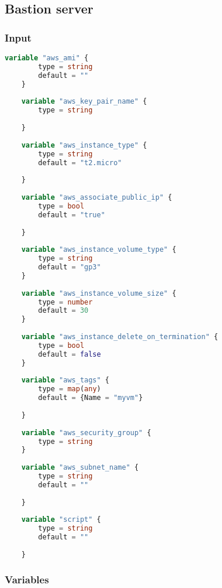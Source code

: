 \subsection{
{Bastion server}}
\label{sec:Bastion server}

\subsubsection{
{Input}}

\begin{lstlisting}[language=terraform]
    variable "aws_ami" {
        type = string
        default = ""
    }
    
    variable "aws_key_pair_name" {
        type = string
      
    }
    
    variable "aws_instance_type" {
        type = string
        default = "t2.micro"
      
    }
    
    variable "aws_associate_public_ip" {
        type = bool
        default = "true"
      
    }
    
    variable "aws_instance_volume_type" {
        type = string
        default = "gp3"
    }
    
    variable "aws_instance_volume_size" {
        type = number
        default = 30
    }
    
    variable "aws_instance_delete_on_termination" {
        type = bool
        default = false
    }
    
    variable "aws_tags" {
        type = map(any)
        default = {Name = "myvm"}
      
    }
    
    variable "aws_security_group" {
        type = string
    }
    
    variable "aws_subnet_name" {
        type = string
        default = ""
      
    }
    
    variable "script" {
        type = string
        default = ""
      
    }
\end{lstlisting}

\subsubsection{
{Variables}}

